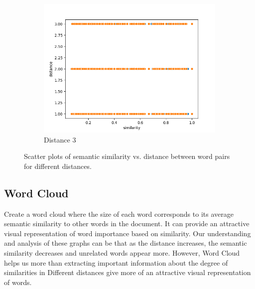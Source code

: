 \documentclass{article}
\begin{document}
\begin{figure}[H]
\begin{subfigure}[b]{0.3\textwidth}
        \includegraphics[width=\textwidth]{img/scatter_plot3.png}
        \caption{Distance 3}
        \label{fig:scatter_plot_3}
    \end{subfigure}
    \caption{Scatter plots of semantic similarity vs. distance between word pairs for different distances.}
    \label{fig:scatter_plots}
\end{figure}

\subsection{Word Cloud}

Create a word cloud where the size of each word corresponds to its average semantic similarity to other words in the document. It can provide an attractive visual representation of word importance based on similarity. Our understanding and analysis of these graphs can be that as the distance increases, the semantic similarity decreases and unrelated words appear more. However, Word Cloud helps us more than extracting important information about the degree of similarities in Different distances give more of an attractive visual representation of words.
\end{document}
